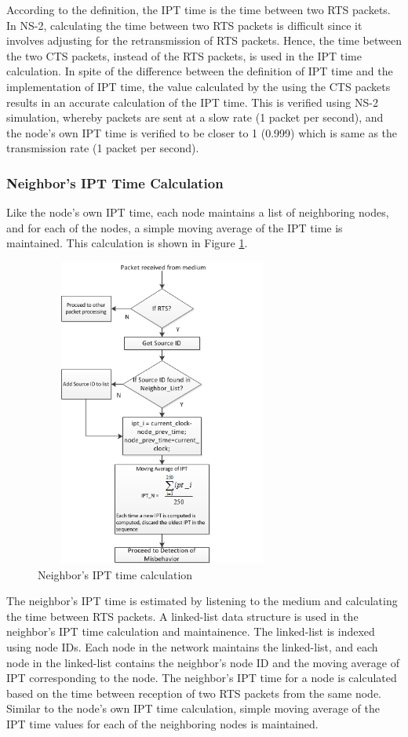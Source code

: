 \documentclass[12pt,letterpaper,english]{article}
\begin{document}
\indent According to the definition, the IPT time is the time between two RTS packets. 
In NS-2, calculating the time between two RTS packets is difficult since it involves adjusting for the retransmission of RTS packets. Hence, the time between the two CTS packets, instead of the RTS packets, is used in the IPT time calculation. In spite of the difference between the definition of IPT time and the implementation of IPT time, the value calculated by the using the CTS packets results in an accurate calculation of the IPT time. This is verified using NS-2 simulation, whereby packets are sent at a slow rate (1 packet per second), and the node's own IPT time is verified to be closer to 1 (0.999) which is same as the transmission rate (1 packet per second). 
\subsubsection{Neighbor's IPT Time Calculation}
\indent Like the node's own IPT time, each node maintains a list of neighboring nodes, and for each of the nodes, a simple moving average of the IPT time is maintained. This calculation is shown in Figure \ref{figure:neighboript}.
\begin{figure}[H]
\centering
\includegraphics[width=3.3in,height=4in]{figures/neighboript.png}
\caption{Neighbor's IPT time calculation}
\label{figure:neighboript}
\end{figure}
The neighbor's IPT time is estimated by listening to the medium and calculating the time between RTS packets. A linked-list data structure is used in the neighbor's IPT time calculation and maintainence. The linked-list is indexed using node IDs. Each node in the network maintains the linked-list, and each node in the linked-list contains the neighbor's node ID and the moving average of IPT corresponding to the node. The neighbor's IPT time for a node is calculated based on the time between reception of two RTS packets from the same node. Similar to the node's own IPT time calculation, simple moving average of the IPT time values for each of the neighboring nodes is maintained. 
\end{document}
